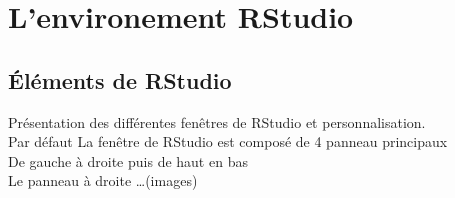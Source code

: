 \section{L'environement RStudio}


\subsection{Éléments de RStudio}
Présentation des différentes fenêtres de RStudio et personnalisation.\\
Par défaut La fenêtre de RStudio est composé de 4 panneau principaux\\
De gauche à droite puis de haut en bas\\

Le panneau à droite \dots (images)





